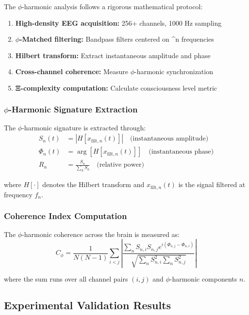 The $\phi$-harmonic analysis follows a rigorous mathematical protocol:

\begin{enumerate}
\item \textbf{High-density EEG acquisition:} 256+ channels, 1000 Hz sampling
\item \textbf{$\phi$-Matched filtering:} Bandpass filters centered on \phi^n frequencies
\item \textbf{Hilbert transform:} Extract instantaneous amplitude and phase
\item \textbf{Cross-channel coherence:} Measure $\phi$-harmonic synchronization
\item \textbf{Ξ-complexity computation:} Calculate consciousness level metric
\end{enumerate}

\subsubsection{$\phi$-Harmonic Signature Extraction}

The $\phi$-harmonic signature is extracted through:
\begin{align}
S_n(t) &= |H[x_{\text{filt},n}(t)]| \quad \text{(instantaneous amplitude)}\\
\Phi_n(t) &= \arg[H[x_{\text{filt},n}(t)]] \quad \text{(instantaneous phase)}\\
R_n &= \frac{S_n}{\sum_{k} S_k} \quad \text{(relative power)}
\end{align}

where $H[\cdot]$ denotes the Hilbert transform and $x_{\text{filt},n}(t)$ is the signal filtered at frequency $f_n$.

\subsubsection{Coherence Index Computation}

The $\phi$-harmonic coherence across the brain is measured as:
\begin{equation}
C_\phi = \frac{1}{N(N-1)} \sum_{i<j} \left| \frac{\sum_n S_{n,i} S_{n,j} e^{i(\Phi_{n,j} - \Phi_{n,i})}}{\sqrt{\sum_n S_{n,i}^2 \sum_n S_{n,j}^2}} \right|
\end{equation}

where the sum runs over all channel pairs $(i,j)$ and $\phi$-harmonic components $n$.

\subsection{Experimental Validation Results}

